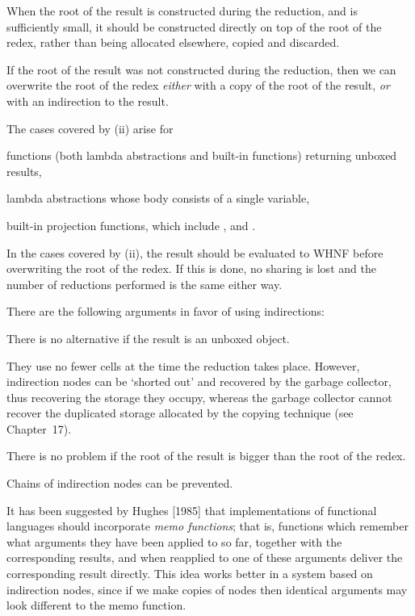 \begin{numbered}
    \item When the root of the result is constructed during the reduction, and is
    sufficiently small, it should be constructed directly on top of the root of
    the redex, rather than being allocated elsewhere, copied and discarded.
    \item If the root of the result was not constructed during the reduction, then we
    can overwrite the root of the redex \textit{either} with a copy of the root of
    the result, \textit{or} with an indirection to the result.
    \item The cases covered by (ii) arise for
    \begin{compactenum}[(a)]
        \item functions (both lambda abstractions and built-in functions)
        returning unboxed results,
        \item lambda abstractions whose body consists of a single variable,
        \item built-in projection functions, which include ,  and .
    \end{compactenum}
    \item In the cases covered by (ii), the result should be evaluated to WHNF
    before overwriting the root of the redex. If this is done, no sharing is lost
    and the number of reductions performed is the same either way.
\end{numbered}

There are the following arguments in favor of using indirections:

\begin{numbered}
    \item There is no alternative if the result is an unboxed object.
    \item They use no fewer cells at the time the reduction takes place. However,
    indirection nodes can be `shorted out' and recovered by the garbage
    collector, thus recovering the storage they occupy, whereas the garbage
    collector cannot recover the duplicated storage allocated by the copying
    technique (see Chapter~17).
    \item There is no problem if the root of the result is bigger than the root of the
    redex.
    \item Chains of indirection nodes can be prevented.
    \item It has been suggested by Hughes [1985] that implementations of
    functional languages should incorporate \textit{memo functions}; that is,
    functions which remember what arguments they have been applied to so
    far, together with the corresponding results, and when reapplied to one
    of these arguments deliver the corresponding result directly. This idea
    works better in a system based on indirection nodes, since if we make
    copies of nodes then identical arguments may look different to the memo
    function.
\end{numbered}

